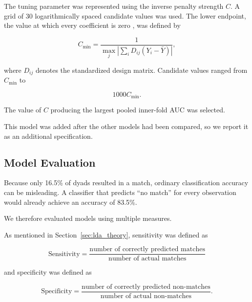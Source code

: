 The tuning parameter was represented using the inverse penalty strength $C$. A grid of 30 logarithmically spaced candidate values was used. The lower endpoint, the value at which every coefficient is zero \cite[Section 2.5, p.~7]{Friedman:2010}, was defined by

\begin{equation}
C_{\min}
=
\frac{
1
}{
\max_j
\left|
\sum_i
D_{ij}(Y_i-\bar{Y})
\right|
},
\end{equation}

where $D_{ij}$ denotes the standardized design matrix. Candidate values ranged from $C_{\min}$ to

\begin{equation}
1000C_{\min}.
\end{equation}

The value of $C$ producing the largest pooled inner-fold AUC was selected.

This model was added after the other models had been compared, so we report it as an additional specification.


\subsection{Model Evaluation}

Because only 16.5\% of dyads resulted in a match, ordinary classification accuracy can be misleading. A classifier that predicts ``no match'' for every observation would already achieve an accuracy of 83.5\%.

We therefore evaluated models using multiple measures.

As mentioned in Section~\ref{sec:lda_theory},
sensitivity was defined as

\begin{equation}
\text{Sensitivity}
=
\frac{
\text{number of correctly predicted matches}
}{
\text{number of actual matches}
}
\end{equation}

and specificity was defined as

\begin{equation}
\text{Specificity}
=
\frac{
\text{number of correctly predicted non-matches}
}{
\text{number of actual non-matches}
}.
\end{equation}

